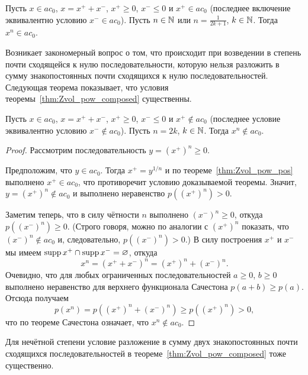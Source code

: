 \begin{theorem}
	\label{thm:Zvol_pow_composed}
	Пусть $x\in ac_0$, $x = x^+ +x^-$, $x^+\geq 0$, $x^- \leq 0$ и $x^+ \in ac_0$
	(последнее включение эквивалентно условию $x^- \in ac_0$).
	Пусть $n\in\mathbb{N}$ или $n = \frac1{2k+1}$, $k\in\mathbb{N}$.
	Тогда $x^n \in ac_0$.
\end{theorem}

Возникает закономерный вопрос о том, что происходит при возведении в степень почти сходящейся к нулю последовательности,
которую нельзя разложить в сумму знакопостоянных почти сходящихся к нулю последовательностей.
Следующая теорема показывает, что условия теоремы~\ref{thm:Zvol_pow_composed} существенны.

\begin{theorem}
	\label{thm:ac0_pow_even}
	Пусть $x\in ac_0$, $x = x^+ +x^-$, $x^+\geq 0$, $x^- \leq 0$ и $x^+ \notin ac_0$
	(последнее условие эквивалентно условию $x^- \notin ac_0$).
	Пусть $n = 2k$, $k\in\mathbb{N}$.
	Тогда $x^n \notin ac_0$.
\end{theorem}

\begin{proof}
	Рассмотрим последовательность $y = (x^+)^n \geq 0$.

	Предположим, что $y \in ac_0$.
	Тогда $x^+ = y^{1/n}$ и по теореме~\ref{thm:Zvol_pow_pos} выполнено $x^+\in ac_0$,
	что противоречит условию доказываемой теоремы.
	Значит, $y = (x^+)^n \notin ac_0$ и выполнено неравенство $p\left((x^+)^n\right) > 0$.

	Заметим теперь, что  в силу чётности $n$ выполнено $(x^-)^n \geq 0$, откуда $p\left((x^-)^n\right) \geq 0$.
	(Строго говоря, можно по аналогии с $(x^+)^n$ показать, что $(x^-)^n\notin ac_0$ и, следовательно, $p\left((x^-)^n\right) > 0$.)
	В силу построения $x^+$ и $x^-$ мы имеем $\operatorname{supp} x^+ \cap \operatorname{supp} x^- = \varnothing$,
	откуда
	\begin{equation}
		x^n = (x^+ + x^-)^n = (x^+)^n + (x^-)^n
		.
	\end{equation}
	Очевидно, что для любых ограниченных последовательностей $a\geq0$, $b\geq 0$ выполнено неравенство для верхнего функционала Сачестона $p(a+b) \geq p(a)$.
	Отсюда получаем
	\begin{equation}
		p(x^n) = p\left((x^+)^n + (x^-)^n\right) \geq p\left((x^+)^n\right) > 0
		,
	\end{equation}
	что по теореме Сачестона означает, что $x^n \notin ac_0$.
\end{proof}

Для нечётной степени условие разложение в сумму двух знакопостоянных почти сходящихся последовательностей в теореме~\ref{thm:Zvol_pow_composed} тоже существенно.

